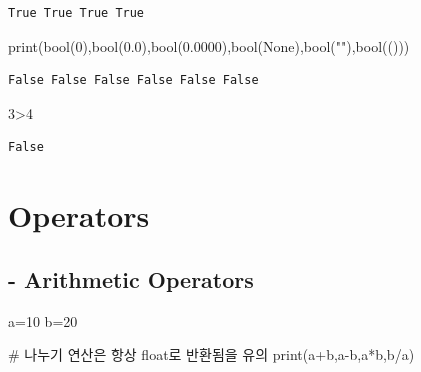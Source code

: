 \documentclass[
  letterpaper,
  DIV=11,
  numbers=noendperiod]{scrreprt}
\newenvironment{Shaded}{\begin{snugshade}}{\end{snugshade}}
\newcommand{\BuiltInTok}[1]{\textcolor[rgb]{0.00,0.23,0.31}{#1}}
\newcommand{\CommentTok}[1]{\textcolor[rgb]{0.37,0.37,0.37}{#1}}
\newcommand{\DecValTok}[1]{\textcolor[rgb]{0.68,0.00,0.00}{#1}}
\newcommand{\FloatTok}[1]{\textcolor[rgb]{0.68,0.00,0.00}{#1}}
\newcommand{\NormalTok}[1]{\textcolor[rgb]{0.00,0.23,0.31}{#1}}
\newcommand{\OperatorTok}[1]{\textcolor[rgb]{0.37,0.37,0.37}{#1}}
\newcommand{\StringTok}[1]{\textcolor[rgb]{0.13,0.47,0.30}{#1}}
\newcommand{\VariableTok}[1]{\textcolor[rgb]{0.07,0.07,0.07}{#1}}
\begin{document}
\begin{verbatim}
True True True True
\end{verbatim}

\begin{Shaded}
\begin{Highlighting}[]
\BuiltInTok{print}\NormalTok{(}\BuiltInTok{bool}\NormalTok{(}\DecValTok{0}\NormalTok{),}\BuiltInTok{bool}\NormalTok{(}\FloatTok{0.0}\NormalTok{),}\BuiltInTok{bool}\NormalTok{(}\FloatTok{0.0000}\NormalTok{),}\BuiltInTok{bool}\NormalTok{(}\VariableTok{None}\NormalTok{),}\BuiltInTok{bool}\NormalTok{(}\StringTok{""}\NormalTok{),}\BuiltInTok{bool}\NormalTok{(()))}
\end{Highlighting}
\end{Shaded}

\begin{verbatim}
False False False False False False
\end{verbatim}

\begin{Shaded}
\begin{Highlighting}[]
\DecValTok{3}\OperatorTok{\textgreater{}}\DecValTok{4}
\end{Highlighting}
\end{Shaded}

\begin{verbatim}
False
\end{verbatim}

\section{Operators}\label{operators}

\subsection{- Arithmetic Operators}\label{arithmetic-operators}

\begin{Shaded}
\begin{Highlighting}[]
\NormalTok{a}\OperatorTok{=}\DecValTok{10}
\NormalTok{b}\OperatorTok{=}\DecValTok{20}
\end{Highlighting}
\end{Shaded}

\begin{Shaded}
\begin{Highlighting}[]
\CommentTok{\# 나누기 연산은 항상 float로 반환됨을 유의}
\BuiltInTok{print}\NormalTok{(a}\OperatorTok{+}\NormalTok{b,a}\OperatorTok{{-}}\NormalTok{b,a}\OperatorTok{*}\NormalTok{b,b}\OperatorTok{/}\NormalTok{a)}
\end{Highlighting}
\end{Shaded}
\end{document}
